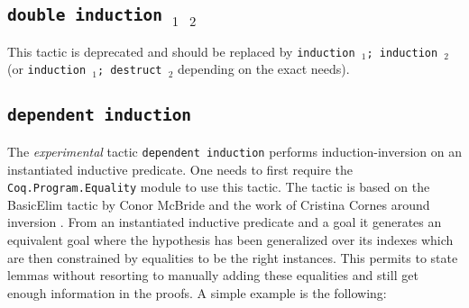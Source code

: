 \subsection{\tt double induction \ident$_1$ \ident$_2$}
This tactic is deprecated and should be replaced by {\tt induction \ident$_1$; induction \ident$_2$} (or {\tt induction \ident$_1$; destruct \ident$_2$} depending on the exact needs).





\subsection{\tt dependent induction \ident
  \label{DepInduction}}

The \emph{experimental} tactic \texttt{dependent induction} performs
induction-inversion on an instantiated inductive predicate.
One needs to first require the {\tt Coq.Program.Equality} module to use
this tactic. The tactic is based on the BasicElim tactic by Conor
McBride \cite{DBLP:conf/types/McBride00} and the work of Cristina Cornes
around inversion \cite{DBLP:conf/types/CornesT95}. From an instantiated
inductive predicate and a goal it generates an equivalent goal where the
hypothesis has been generalized over its indexes which are then
constrained by equalities to be the right instances. This permits to
state lemmas without resorting to manually adding these equalities and
still get enough information in the proofs. 
A simple example is the following:

